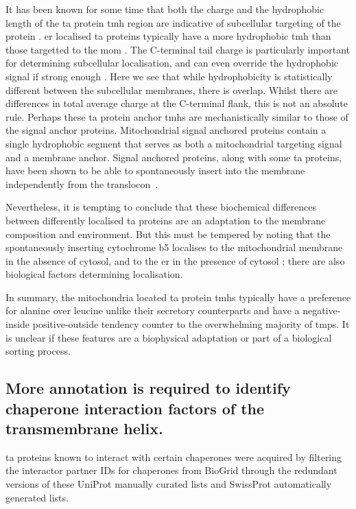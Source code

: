 It has been known for some time that both the charge and the hydrophobic length of the \gls{ta} protein \gls{tmh} region are indicative of subcellular targeting of the protein \cite{Borgese2007}.
\gls{er} localised \gls{ta} proteins typically have a more hydrophobic \gls{tmh} than those targetted to the \gls{mom} \cite{Wang2010}.
The C\--terminal tail charge is particularly important for determining subcellular localisation, and can even override the hydrophobic signal if strong enough \cite{Costello2017}.
Here we see that while hydrophobicity is statistically different between the subcellular membranes, there is overlap.
Whilst there are differences in total average charge at the C\--terminal flank, this is not an absolute rule.
Perhaps these \gls{ta} protein anchor \gls{tmh}s are mechanistically similar to those of the signal anchor proteins.
Mitochondrial signal anchored proteins contain a single hydrophobic segment that serves as both a mitochondrial targeting signal and a membrane anchor.
Signal anchored proteins, along with some \gls{ta} proteins, have been shown to be able to spontaneously insert into the membrane independently from the translocon~\cite{Elisa2012, Lan2000, Colombo2009}.

Nevertheless, it is tempting to conclude that these biochemical differences between differently localised \gls{ta} proteins are an adaptation to the membrane composition and environment.
But this must be tempered by noting that the spontaneously inserting cytochrome b5 localises to the mitochondrial membrane in the absence of cytosol, and to the \gls{er} in the presence of cytosol \cite{Costa2018}; there are also biological factors determining localisation.

In summary, the mitochondria located \gls{ta} protein \gls{tmh}s typically have a preference for alanine over leucine unlike their secretory counterparts and have a negative\--inside positive\--outside tendency counter to the overwhelming majority of \gls{tmp}s.
It is unclear if these features are a biophysical adaptation or part of a biological sorting process.

\subsection{More annotation is required to identify chaperone interaction factors of the transmembrane helix.}

\gls{ta} proteins known to interact with certain chaperones were acquired by filtering the interactor partner IDs for chaperones from BioGrid through the redundant versions of these UniProt manually curated lists and SwissProt automatically generated lists.

